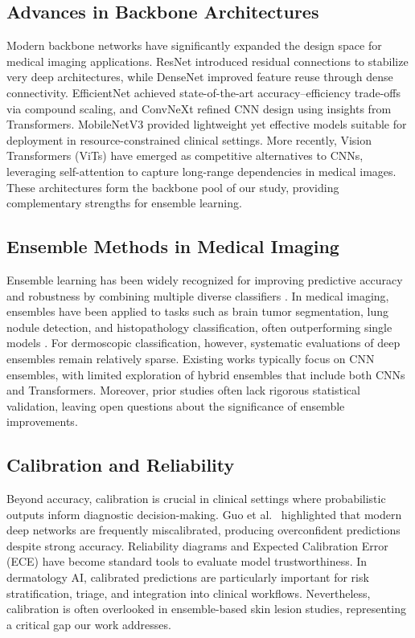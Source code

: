 \documentclass[preprint,12pt]{elsarticle}
\begin{document}
\subsection{Advances in Backbone Architectures}
Modern backbone networks have significantly expanded the design space for medical imaging applications. ResNet \citet{he2016resnet} introduced residual connections to stabilize very deep architectures, while DenseNet \citet{huang2017densenet} improved feature reuse through dense connectivity. EfficientNet \citet{tan2019efficientnet} achieved state-of-the-art accuracy–efficiency trade-offs via compound scaling, and ConvNeXt \citet{liu2022convnext} refined CNN design using insights from Transformers. MobileNetV3 \citet{howard2019mobilenetv3} provided lightweight yet effective models suitable for deployment in resource-constrained clinical settings. More recently, Vision Transformers (ViTs) \citep{dosovitskiy2021vit} have emerged as competitive alternatives to CNNs, leveraging self-attention to capture long-range dependencies in medical images. These architectures form the backbone pool of our study, providing complementary strengths for ensemble learning.

\subsection{Ensemble Methods in Medical Imaging}
Ensemble learning has been widely recognized for improving predictive accuracy and robustness by combining multiple diverse classifiers \citep{dietterich2000ensemble}. In medical imaging, ensembles have been applied to tasks such as brain tumor segmentation, lung nodule detection, and histopathology classification, often outperforming single models \citep{valverde2021ensembles}. For dermoscopic classification, however, systematic evaluations of deep ensembles remain relatively sparse. Existing works typically focus on CNN ensembles, with limited exploration of hybrid ensembles that include both CNNs and Transformers. Moreover, prior studies often lack rigorous statistical validation, leaving open questions about the significance of ensemble improvements.

\subsection{Calibration and Reliability}
Beyond accuracy, calibration is crucial in clinical settings where probabilistic outputs inform diagnostic decision-making. Guo et al.\ \citet{guo2017calibration} highlighted that modern deep networks are frequently miscalibrated, producing overconfident predictions despite strong accuracy. Reliability diagrams and Expected Calibration Error (ECE) have become standard tools to evaluate model trustworthiness. In dermatology AI, calibrated predictions are particularly important for risk stratification, triage, and integration into clinical workflows. Nevertheless, calibration is often overlooked in ensemble-based skin lesion studies, representing a critical gap our work addresses.
\end{document}
